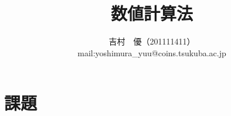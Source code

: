 \documentclass[11pt,a4paper,a4j]{jsarticle}
\title{数値計算法}
\author{吉村　優（201111411）\\
mail:yoshimura\_yuu@coins.tsukuba.ac.jp}
\begin{document}
\maketitle

\part*{課題}
\end{document}

